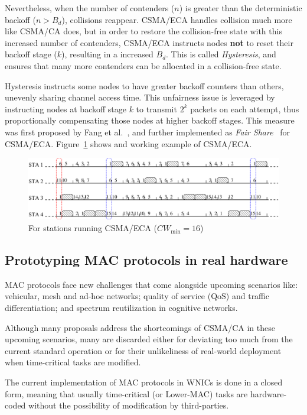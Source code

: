 Nevertheless, when the number of contenders ($n$) is greater than the deterministic backoff ($n>B_{d}$), collisions reappear. CSMA/ECA handles collision much more like CSMA/CA does, but in order to restore the collision-free state with this increased number of contenders, CSMA/ECA instructs nodes {\bfseries not} to reset their backoff stage ($k$), resulting in a increased $B_{d}$. This is called \emph{Hysteresis}, and ensures that many more contenders can be allocated in a collision-free state.

Hysteresis instructs some nodes to have greater backoff counters than others, unevenly sharing channel access time. This unfairness issue is leveraged by instructing nodes at backoff stage $k$ to transmit $2^{k}$ packets on each attempt, thus proportionally compensating those nodes at higher backoff stages. This measure was first proposed by Fang et al.~\cite{L_MAC2}, and further implemented as \emph{Fair Share}~\cite{research2standards} for CSMA/ECA. Figure~\ref{fig:csmaECA} shows and working example of CSMA/ECA.

\begin{figure}[htbp]
  \centering
  \includegraphics[width=\linewidth]{csma_eca_different_backoff_short.eps}
  \caption{For stations running CSMA/ECA ($CW_{\min}=16$)
  \label{fig:csmaECA}}
\end{figure}

\subsection{Prototyping MAC protocols in real hardware}
MAC protocols face new challenges that come alongside upcoming scenarios like: vehicular, mesh and ad-hoc networks; quality of service (QoS) and traffic differentiation; and spectrum reutilization in cognitive networks. 

Although many proposals address the shortcomings of CSMA/CA in these upcoming scenarios, many are discarded either for deviating too much from the current standard operation or for their unlikeliness of real-world deployment when time-critical tasks are modified.

The current implementation of MAC protocols in WNICs is done in a closed form, meaning that usually time-critical (or Lower-MAC) tasks are hardware-coded without the possibility of modification by third-parties.

